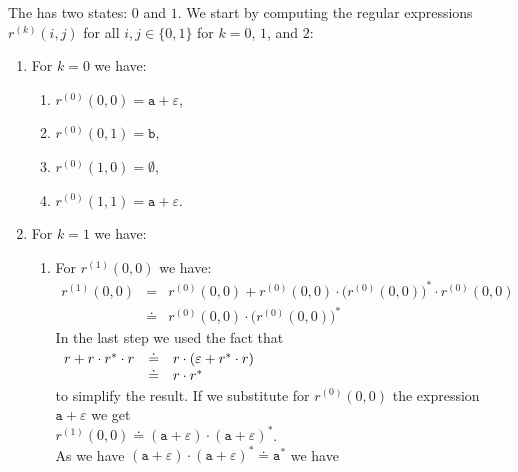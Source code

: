 \solutionEng
The  has two states: $0$ and $1$.  We start by computing the regular expressions
$r^{(k)}(i,j)$ for all $i,j\in\{0,1\}$ for  $k =0$, $1$, and $2$:
\begin{enumerate}
\item For $k = 0$ we have:
      \begin{enumerate}
      \item $r^{(0)}(0, 0) = \texttt{a} + \varepsilon$,
      \item $r^{(0)}(0, 1) = \texttt{b}$,
      \item $r^{(0)}(1, 0) = \emptyset$,
      \item $r^{(0)}(1, 1) = \texttt{a} + \varepsilon$.
      \end{enumerate}
\item For $k=1$ we have:
      \begin{enumerate}
      \item For $r^{(1)}(0, 0)$ we have:
            \begin{eqnarray*}
                  r^{(1)}(0, 0) 
            & = & r^{(0)}(0, 0) + 
                  r^{(0)}(0, 0) \cdot \bigl(r^{(0)}(0, 0)\bigr)^* \cdot r^{(0)}(0, 0) \\
            & \doteq & r^{(0)}(0, 0) \cdot \bigl(r^{(0)}(0, 0)\bigr)^*
            \end{eqnarray*}
             In the last step we used the fact that 
             \\[0.2cm]
             \hspace*{1.3cm}
             $
             \begin{array}[t]{lcl}
               r + r \cdot r^* \cdot r & \doteq & r \cdot (\varepsilon + r^* \cdot r) \\
                                       & \doteq & r \cdot r^*
             \end{array}
             $
             \\[0.2cm]
             to simplify the result.
             If we substitute for $r^{(0)}(0, 0)$ the expression $\texttt{a} + \varepsilon$  
             we get 
             \\[0.2cm]
             \hspace*{1.3cm}
             $r^{(1)}(0, 0) \doteq (\texttt{a} + \varepsilon)\cdot (\texttt{a} + \varepsilon)^*$.
             \\[0.2cm]
             As we have $(\texttt{a} + \varepsilon)\cdot (\texttt{a} + \varepsilon)^* \doteq \texttt{a}^*$ we have
             \\[0.2cm]

\end{enumerate}
\end{enumerate}
